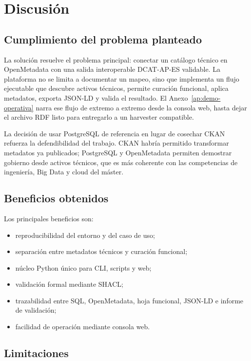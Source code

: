 \chapter{Discusión}

\section{Cumplimiento del problema planteado}

La solución resuelve el problema principal: conectar un catálogo técnico en OpenMetadata con una salida interoperable DCAT-AP-ES validable. La plataforma no se limita a documentar un mapeo, sino que implementa un flujo ejecutable que descubre activos técnicos, permite curación funcional, aplica metadatos, exporta JSON-LD y valida el resultado. El Anexo~\ref{ap:demo-operativa} narra ese flujo de extremo a extremo desde la consola web, hasta dejar el archivo RDF listo para entregarlo a un harvester compatible.

La decisión de usar PostgreSQL de referencia en lugar de cosechar CKAN refuerza la defendibilidad del trabajo. CKAN habría permitido transformar metadatos ya publicados; PostgreSQL y OpenMetadata permiten demostrar gobierno desde activos técnicos, que es más coherente con las competencias de ingeniería, Big Data y cloud del máster.

\section{Beneficios obtenidos}

Los principales beneficios son:

\begin{itemize}
  \item reproducibilidad del entorno y del caso de uso;
  \item separación entre metadatos técnicos y curación funcional;
  \item núcleo Python único para CLI, scripts y web;
  \item validación formal mediante SHACL;
  \item trazabilidad entre SQL, OpenMetadata, hoja funcional, JSON-LD e informe de validación;
  \item facilidad de operación mediante consola web.
\end{itemize}

\section{Limitaciones}

